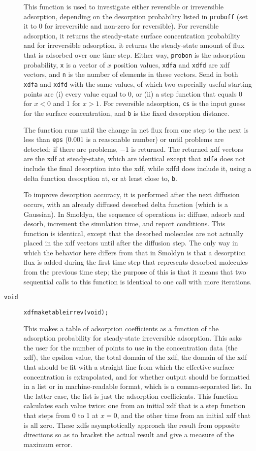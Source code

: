 \documentclass[11pt]{article}
\newcommand {\ttt} {\texttt}
\begin{document}
\begin{description}
This function is used to investigate either reversible or irreversible adsorption, depending on the desorption probability listed in \ttt{proboff} (set it to 0 for irreversible and non-zero for reversible). For reversible adsorption, it returns the steady-state surface concentration probability and for irreversible adsorption, it returns the steady-state amount of flux that is adsorbed over one time step. Either way, \ttt{probon} is the adsorption probability, \ttt{x} is a vector of $x$ position values, \ttt{xdfa} and \ttt{xdfd} are xdf vectors, and \ttt{n} is the number of elements in these vectors. Send in both \ttt{xdfa} and \ttt{xdfd} with the same values, of which two especially useful starting points are (i) every value equal to 0, or (ii) a step function that equals 0 for $x < 0$ and 1 for $x > 1$. For reversible adsorption, \ttt{cs} is the input guess for the surface concentration, and \ttt{b} is the fixed desorption distance.

The function runs until the change in net flux from one step to the next is less than \ttt{eps} (0.001 is a reasonable number) or until problems are detected; if there are problems, $-1$ is returned. The returned xdf vectors are the xdf at steady-state, which are identical except that \ttt{xdfa} does not include the final desorption into the xdf, while xdfd does include it, using a delta function desorption at, or at least close to, \ttt{b}.

To improve desorption accuracy, it is performed after the next diffusion occurs, with an already diffused desorbed delta function (which is a Gaussian). In Smoldyn, the sequence of operations is: diffuse, adsorb and desorb, increment the simulation time, and report conditions. This function is identical, except that the desorbed molecules are not actually placed in the xdf vectors until after the diffusion step. The only way in which the behavior here differs from that in Smoldyn is that a desorption flux is added during the first time step that represents desorbed molecules from the previous time step; the purpose of this is that it means that two sequential calls to this function is identical to one call with more iterations.

\item[\ttt{void}] 
\ttt{xdfmaketableirrev(void);}

This makes a table of adsorption coefficients as a function of the adsorption probability for steady-state irreversible adsorption. This asks the user for the number of points to use in the concentration data (the xdf), the epsilon value, the total domain of the xdf, the domain of the xdf that should be fit with a straight line from which the effective surface concentration is extrapolated, and for whether output should be formatted in a list or in machine-readable format, which is a comma-separated list. In the latter case, the list is just the adsorption coefficients. This function calculates each value twice: one from an initial xdf that is a step function that steps from 0 to 1 at $x = 0$, and the other time from an initial xdf that is all zero. These xdfs asymptotically approach the result from opposite directions so as to bracket the actual result and give a measure of the maximum error.


\end{description}
\end{document}
